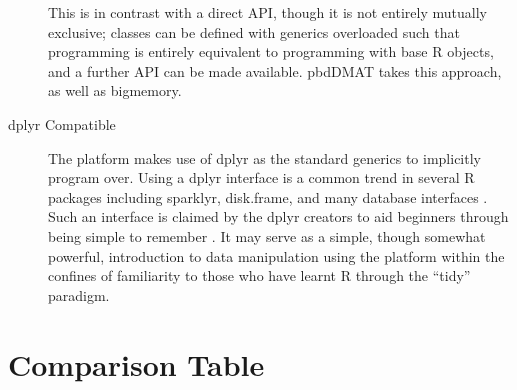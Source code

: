 \documentclass[a4paper,10pt]{article}
\begin{document}
\begin{description}
	      This is in contrast with a direct API, though it is not entirely
	      mutually exclusive;
	      classes can be defined with generics overloaded such that
	      programming is entirely equivalent to programming with base
	      R objects, and a further API can be made available.
	      pbdDMAT takes this approach, as well as
	      bigmemory\cite{pbdDMATpackage}\cite{kane13:bigmemory}.
	\item[dplyr Compatible]
	      The platform makes use of dplyr as the standard generics to
	      implicitly program over.
	      Using a dplyr interface is a common trend in several R packages
	      including sparklyr, disk.frame, and many database interfaces
	      \cite{luraschi20}\cite{zj20}.
	      Such an interface is claimed by the dplyr creators to aid
	      beginners through being simple to remember \cite{wickham2019welcome}.
	      It may serve as a simple, though somewhat powerful, introduction
	      to data manipulation using the platform within the confines
	      of familiarity to those who have learnt R through the ``tidy''
	      paradigm.
\end{description}

\section{Comparison Table}\label{sec:comp-tab}
\end{document}
